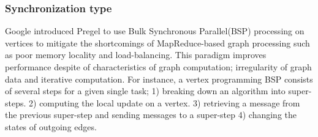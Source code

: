 

\subsubsection{Synchronization type}
Google introduced Pregel\cite{pregel} to use Bulk Synchronous Parallel(BSP) processing on vertices to mitigate the shortcomings of MapReduce-based graph processing such as poor memory locality and load-balancing. This paradigm improves performance despite of characteristics of graph computation; irregularity of graph data and iterative computation. For instance, a vertex programming BSP consists of several steps for a given single task; 1) breaking down an algorithm into super-steps. 2) computing the local update on a vertex. 3) retrieving a message from the previous super-step and sending messages to a super-step 4) changing the states of outgoing edges.


